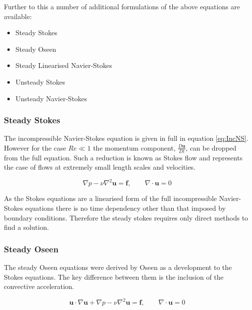 \documentclass[11pt, a4paper]{report}
\begin{document}
\noindent
Further to this a number of additional formulations of the above equations are available:
\begin{itemize}
\item Steady Stokes
\item Steady Oseen
\item Steady Linearised Navier-Stokes
\item Unsteady Stokes
\item Unsteady Navier-Stokes
\end{itemize}

\subsubsection{Steady Stokes}
The incompressible Navier-Stokes equation is given in full in equation \ref{eq:IncNS}. However for the case $Re \ll 1$ the momentum component, $\frac{D \mathbf{u}}{D t}$, can be dropped from the full equation. Such a reduction is known as Stokes flow and represents the case of flows at extremely small length scales and velocities.

\begin{equation}
\nabla p - \nu \nabla^{2} \mathbf{u} = \mathbf{f}, \qquad \nabla \cdot \mathbf{u} = 0
\label{eq:SteadyStokes}
\end{equation}

As the Stokes equations are a linearised form of the full incompressible Navier-Stokes equations there is no time dependency other than that imposed by boundary conditions. Therefore the steady stokes requires only direct methods to find a solution.

\subsubsection{Steady Oseen}
The steady Oseen equations were derived by Oseen\cite{Oseen1910} as a development to the Stokes equations. The key difference between them is the inclusion of the convective acceleration.

\begin{equation}
\mathbf{u} \cdot \nabla \mathbf{u} + \nabla p - \nu \nabla^{2} \mathbf{u} = \mathbf{f}, \qquad \nabla \cdot \mathbf{u} = 0
\label{eq:SteadyOseen}
\end{equation}
\end{document}
